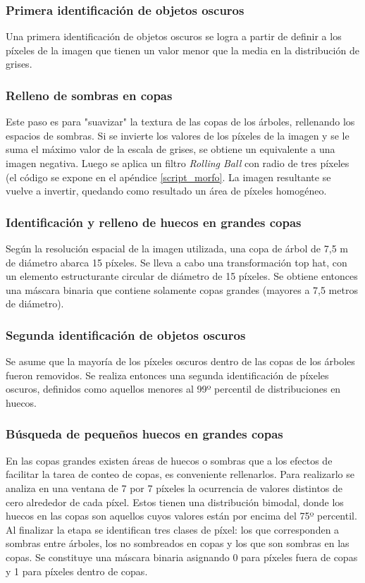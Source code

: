 \subsubsection{Primera identificación de objetos oscuros}
Una primera identificación de objetos oscuros se logra a partir de definir a los píxeles de la imagen que tienen un valor menor que la media en la distribución de grises.
\subsubsection{Relleno de sombras en copas}
Este paso es para "suavizar" la textura de las copas de los árboles, rellenando los espacios de sombras.
Si se invierte los valores de los píxeles de la imagen y se le suma el máximo valor de la escala de grises, se obtiene un equivalente a una imagen negativa. Luego se aplica un filtro \textit{Rolling Ball} con radio de tres píxeles (el código se expone en el apéndice \ref{script_morfo}. La imagen resultante se vuelve a invertir, quedando como resultado un área de píxeles homogéneo.
\subsubsection{Identificación y relleno de huecos en grandes copas}
Según la resolución espacial de la imagen utilizada, una copa de árbol de 7,5 m de diámetro abarca 15 píxeles. Se lleva a cabo una transformación top hat, con un elemento estructurante circular de diámetro de 15 píxeles. Se obtiene entonces una máscara binaria que contiene solamente copas grandes (mayores a 7,5 metros de diámetro).
\subsubsection{ Segunda identificación de objetos oscuros}
Se asume que la mayoría de los píxeles oscuros dentro de las copas de los árboles fueron removidos. Se realiza entonces una segunda identificación de píxeles oscuros, definidos como aquellos menores al 99º percentil de distribuciones en huecos.
\subsubsection{Búsqueda de pequeños huecos en grandes copas}
En las copas grandes existen áreas de huecos o sombras que a los efectos de facilitar la tarea de conteo de copas, es conveniente rellenarlos. Para realizarlo se analiza en una ventana de 7 por 7 píxeles la ocurrencia de valores distintos de cero alrededor de cada píxel. Estos tienen una distribución bimodal, donde los huecos en las copas son aquellos cuyos valores están por encima del 75º percentil. Al finalizar la etapa se identifican tres clases de píxel: los que corresponden a sombras entre árboles, los no sombreados en copas y los que son sombras en las copas. Se constituye una máscara binaria asignando 0 para píxeles fuera de copas y 1 para píxeles dentro de copas.
